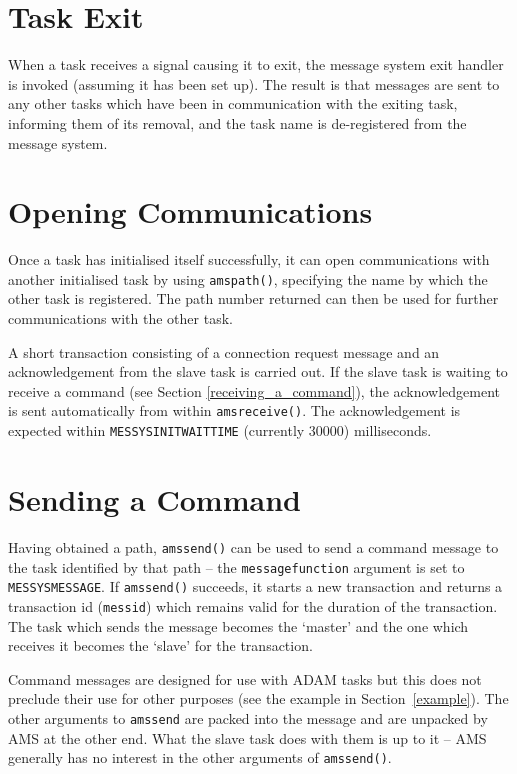 \documentclass[twoside,11pt]{article}
\newcommand{\htmlref}[2]{#1}
\newcommand{\latex}[1]{#1}
\renewcommand{\_}{\texttt{\symbol{95}}}
\begin{document}
\section{Task Exit}
When a task receives a signal causing it to exit, the message system exit
handler is invoked (assuming it has been set up).
The result is that messages are sent to any other tasks which have been in
communication with the exiting task, informing them of its removal, and the
task name is de-registered from the message system.

\section{Opening Communications}
Once a task has initialised itself successfully, it can open communications
with another initialised task by using
\htmlref{\texttt{ams\_path()}}{AMS_PATH},
specifying the name by which the other task is registered.
The path number returned can then be used for further communications with the
other task.

A short transaction consisting of a connection request message and an
acknowledgement from the slave task is carried out.
If the slave task is
\htmlref{waiting to receive a command}
{receiving_a_command}\latex{ (see Section \ref{receiving_a_command})},
the acknowledgement is sent automatically from within
\htmlref{\texttt{ams\_receive()}}{AMS_RECEIVE}.
The acknowledgement is expected within \texttt{MESSYS\_\_INIT\_WAIT\_TIME}
(currently 30000) milliseconds.

\section{\label{sending_a_command}Sending a Command}
Having obtained a path,
\htmlref{\texttt{ams\_send()}}{AMS_SEND}
can be used to send a command message to the task identified by that path --
the \texttt{message\_function} argument is set to \texttt{MESSYS\_\_MESSAGE}.
If \texttt{ams\_send()} succeeds, it starts a new transaction and returns
a transaction id (\texttt{messid}) which remains valid for the duration of the
transaction. The task which sends the message becomes the `master' and
the one which receives it becomes the `slave' for the transaction.

Command messages are designed for use with ADAM tasks but this does not
preclude their use for other purposes (see the
\htmlref{example}{example}\latex{ in Section~\ref{example}}).
The other arguments to \texttt{ams\_send} are packed into the message and are
unpacked by AMS at the other end.
What the slave task does with them is up to it -- AMS generally has no
interest in the other arguments of \texttt{ams\_send()}.
\end{document}
